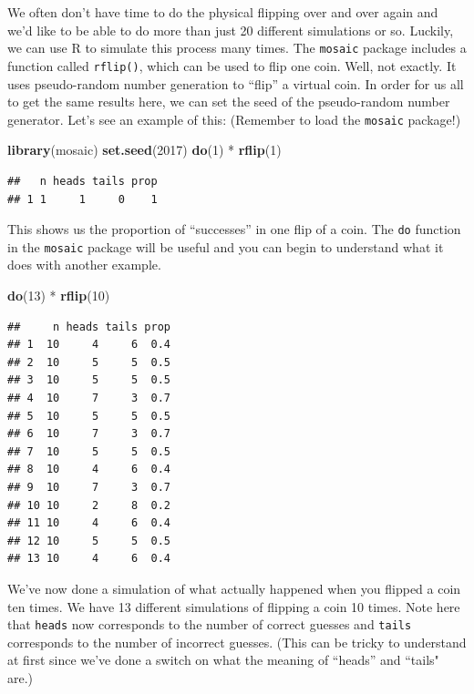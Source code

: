 \documentclass[]{tufte-book}
\newenvironment{Shaded}{\begin{snugshade}}{\end{snugshade}}
\newcommand{\KeywordTok}[1]{\textcolor[rgb]{0.13,0.29,0.53}{\textbf{{#1}}}}
\newcommand{\DecValTok}[1]{\textcolor[rgb]{0.00,0.00,0.81}{{#1}}}
\newcommand{\StringTok}[1]{\textcolor[rgb]{0.31,0.60,0.02}{{#1}}}
\newcommand{\NormalTok}[1]{{#1}}
\begin{document}
We often don't have time to do the physical flipping over and over again
and we'd like to be able to do more than just 20 different simulations
or so. Luckily, we can use R to simulate this process many times. The
\texttt{mosaic} package includes a function called \texttt{rflip()},
which can be used to flip one coin. Well, not exactly. It uses
pseudo-random number generation to ``flip'' a virtual coin. In order for
us all to get the same results here, we can set the seed of the
pseudo-random number generator. Let's see an example of this: (Remember
to load the \texttt{mosaic} package!)

\begin{Shaded}
\begin{Highlighting}[]
\KeywordTok{library}\NormalTok{(mosaic)}
\KeywordTok{set.seed}\NormalTok{(}\DecValTok{2017}\NormalTok{)}
\KeywordTok{do}\NormalTok{(}\DecValTok{1}\NormalTok{) *}\StringTok{ }\KeywordTok{rflip}\NormalTok{(}\DecValTok{1}\NormalTok{)}
\end{Highlighting}
\end{Shaded}

\begin{verbatim}
##   n heads tails prop
## 1 1     1     0    1
\end{verbatim}

This shows us the proportion of ``successes'' in one flip of a coin. The
\texttt{do} function in the \texttt{mosaic} package will be useful and
you can begin to understand what it does with another example.

\begin{Shaded}
\begin{Highlighting}[]
\KeywordTok{do}\NormalTok{(}\DecValTok{13}\NormalTok{) *}\StringTok{ }\KeywordTok{rflip}\NormalTok{(}\DecValTok{10}\NormalTok{)}
\end{Highlighting}
\end{Shaded}

\begin{verbatim}
##     n heads tails prop
## 1  10     4     6  0.4
## 2  10     5     5  0.5
## 3  10     5     5  0.5
## 4  10     7     3  0.7
## 5  10     5     5  0.5
## 6  10     7     3  0.7
## 7  10     5     5  0.5
## 8  10     4     6  0.4
## 9  10     7     3  0.7
## 10 10     2     8  0.2
## 11 10     4     6  0.4
## 12 10     5     5  0.5
## 13 10     4     6  0.4
\end{verbatim}

We've now done a simulation of what actually happened when you flipped a
coin ten times. We have 13 different simulations of flipping a coin 10
times. Note here that \texttt{heads} now corresponds to the number of
correct guesses and \texttt{tails} corresponds to the number of
incorrect guesses. (This can be tricky to understand at first since
we've done a switch on what the meaning of ``heads'' and ``tails" are.)
\end{document}
